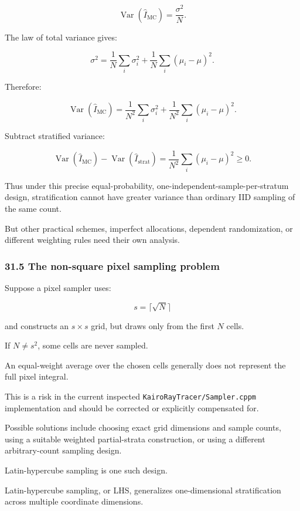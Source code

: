 \[ \operatorname{Var}(\widehat I_{\mathrm{MC}}) = \frac{\sigma^2}{N}. \]

The law of total variance gives:

\[ \sigma^2= \frac1N\sum_i\sigma_i^2 + \frac1N\sum_i(\mu_i-\mu)^2. \]

Therefore:

\[ \operatorname{Var}(\widehat I_{\mathrm{MC}}) = \frac1{N^2}\sum_i\sigma_i^2 + \frac1{N^2}\sum_i(\mu_i-\mu)^2. \]

Subtract stratified variance:

\[ \boxed{ \operatorname{Var}(\widehat I_{\mathrm{MC}}) - \operatorname{Var}(\widehat I_{\mathrm{strat}}) = \frac1{N^2}\sum_i(\mu_i-\mu)^2 \ge0 }. \]

Thus under this precise equal-probability, one-independent-sample-per-stratum design, stratification cannot have greater variance than ordinary IID sampling of the same count.

But other practical schemes, imperfect allocations, dependent randomization, or different weighting rules need their own analysis.

\subsubsection{31.5 The non-square pixel sampling problem}\label{the-non-square-pixel-sampling-problem}

Suppose a pixel sampler uses:

\[ s=\lceil\sqrt N\rceil \]

and constructs an \(s\times s\) grid, but draws only from the first \(N\) cells.

If \(N\ne s^2\), some cells are never sampled.

An equal-weight average over the chosen cells generally does not represent the full pixel integral.

This is a risk in the current inspected \texttt{KairoRayTracer/Sampler.cppm} implementation and should be corrected or explicitly compensated for.

Possible solutions include choosing exact grid dimensions and sample counts, using a suitable weighted partial-strata construction, or using a different arbitrary-count sampling design.

Latin-hypercube sampling is one such design.

Latin-hypercube sampling, or LHS, generalizes one-dimensional stratification across multiple coordinate dimensions.

